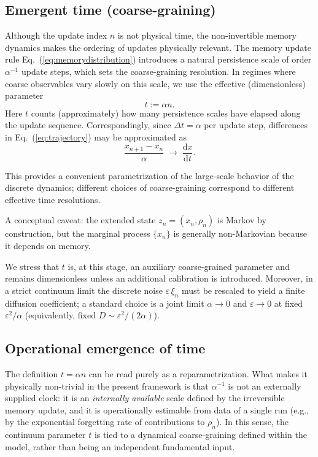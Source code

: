 \documentclass[reprint,amsmath,amssymb,aps,prd,nofootinbib,floatfix]{revtex4-2}
\begin{document}
\FloatBarrier

\subsection{Emergent time (coarse-graining)}\label{sec:EmergenceTime}

Although the update index $n$ is not physical time, the non-invertible memory dynamics makes the ordering of updates physically relevant.
The memory update rule Eq.~(\ref{eq:memorydistribution}) introduces a natural persistence scale of order $\alpha^{-1}$ update steps, which sets the coarse-graining resolution.
In regimes where coarse observables vary slowly on this scale, we use the effective (dimensionless) parameter
\begin{equation}\label{eq:t_taup}
t := \alpha n.
\end{equation}
Here $t$ counts (approximately) how many persistence scales have elapsed along the update sequence.
Correspondingly, since $\Delta t = \alpha$ per update step, differences in Eq.~(\ref{eq:trajectory}) may be approximated as
\begin{equation}
\frac{x_{n+1} - x_n}{\alpha}
\;\longrightarrow\;
\frac{\mathrm{d}x}{\mathrm{d}t}.
\end{equation}

This provides a convenient parametrization of the large-scale behavior of the discrete dynamics; different choices of coarse-graining correspond to different effective time resolutions.

A conceptual caveat: the extended state $z_n=(x_n,\rho_n)$ is Markov by construction, but the marginal process $\{x_n\}$ is generally non-Markovian because it depends on memory.

We stress that $t$ is, at this stage, an auxiliary coarse-grained parameter and remains dimensionless unless an additional calibration is introduced.
Moreover, in a strict continuum limit the discrete noise $\varepsilon\,\xi_n$ must be rescaled to yield a finite diffusion coefficient; a standard choice is a joint limit $\alpha\to 0$ and $\varepsilon\to 0$ at fixed $\varepsilon^2/\alpha$ (equivalently, fixed $D\sim \varepsilon^2/(2\alpha)$).

\subsection{Operational emergence of time}

The definition $t=\alpha n$ can be read purely as a reparametrization.
What makes it physically non-trivial in the present framework is that $\alpha^{-1}$ is not an externally supplied clock: it is an \emph{internally available} scale defined by the irreversible memory update, and it is operationally estimable from data of a single run (e.g., by the exponential forgetting rate of contributions to $\rho_n$).
In this sense, the continuum parameter $t$ is tied to a dynamical coarse-graining defined within the model, rather than being an independent fundamental input.
\end{document}
